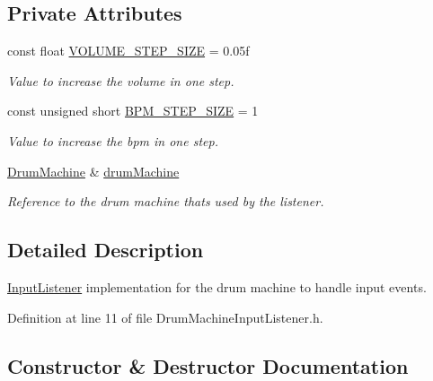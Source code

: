 \subsection*{Private Attributes}
\begin{DoxyCompactItemize}
\item 
const float \hyperlink{class_drum_machine_input_listener_a983e85ff0ebfbb3de0a917134488570c}{V\+O\+L\+U\+M\+E\+\_\+\+S\+T\+E\+P\+\_\+\+S\+I\+ZE} = 0.\+05f
\begin{DoxyCompactList}\small\item\em Value to increase the volume in one step. \end{DoxyCompactList}\item 
const unsigned short \hyperlink{class_drum_machine_input_listener_ad4f83d21be6ff1ba703a27d8c9a04c9a}{B\+P\+M\+\_\+\+S\+T\+E\+P\+\_\+\+S\+I\+ZE} = 1
\begin{DoxyCompactList}\small\item\em Value to increase the bpm in one step. \end{DoxyCompactList}\item 
\hyperlink{class_drum_machine}{Drum\+Machine} \& \hyperlink{class_drum_machine_input_listener_ae3f80aad0a5c4b2e4ad2712423102feb}{drum\+Machine}
\begin{DoxyCompactList}\small\item\em Reference to the drum machine thats used by the listener. \end{DoxyCompactList}\end{DoxyCompactItemize}


\subsection{Detailed Description}
\hyperlink{class_input_listener}{Input\+Listener} implementation for the drum machine to handle input events. 

Definition at line 11 of file Drum\+Machine\+Input\+Listener.\+h.



\subsection{Constructor \& Destructor Documentation}
\mbox{\label{class_drum_machine_input_listener_a7552c36ebae9e6ae49f8929ae9853354}} 
